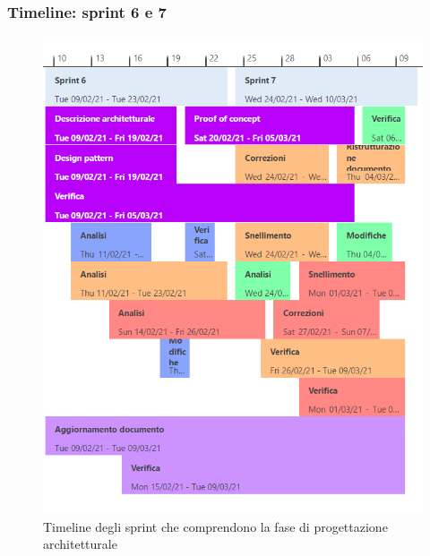\subsubsection{Timeline: sprint 6 e 7}
\begin{figure}[H]
    \centering
    \includegraphics[scale = 0.5]{components/img/sprint6-7.png}
    \caption{Timeline degli sprint che comprendono la  fase di progettazione architetturale}
    \label{fig:Timeline,sprint 6 e 7, fase di progettazione architetturale}
\end{figure}

